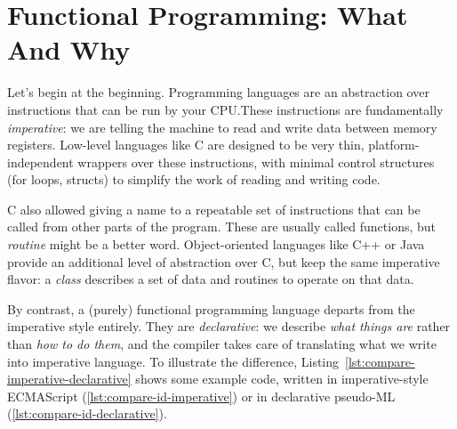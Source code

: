 \documentclass{book}
\begin{document}
\section{Functional Programming: What And Why}

Let's begin at the beginning. Programming languages are an abstraction over instructions that can be run by your CPU.\@ These instructions are fundamentally \emph{imperative}: we are telling the machine to read and write data between memory registers. Low-level languages like C are designed to be very thin, platform-independent wrappers over these instructions, with minimal control structures (for loops, structs) to simplify the work of reading and writing code.

C also allowed giving a name to a repeatable set of instructions that can be called from other parts of the program. These are usually called functions, but \emph{routine} might be a better word. Object-oriented languages like C++ or Java provide an additional level of abstraction over C, but keep the same imperative flavor: a \emph{class} describes a set of data and routines to operate on that data.

By contrast, a (purely) functional programming language departs from the imperative style entirely. They are \emph{declarative}: we describe \emph{what things are} rather than \emph{how to do them}, and the compiler takes care of translating what we write into imperative language. To illustrate the difference, Listing~\ref{lst:compare-imperative-declarative} shows some example code, written in imperative-style ECMAScript (\ref{lst:compare-id-imperative}) or in declarative pseudo-ML (\ref{lst:compare-id-declarative}). 
\end{document}
